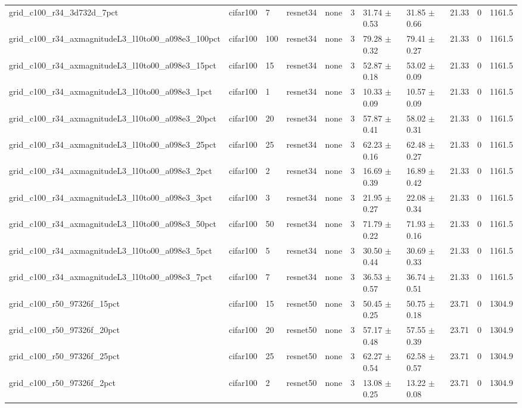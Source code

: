 \begin{tabular}{lllllllllll}
grid_c100_r34_3d732d_7pct & cifar100 & 7 & resnet34 & none & 3 & 31.74 $\pm$ 0.53 & 31.85 $\pm$ 0.66 & 21.33 & 0 & 1161.5 \\
grid_c100_r34_axmagnitudeL3_l10to00_a098e3_100pct & cifar100 & 100 & resnet34 & none & 3 & 79.28 $\pm$ 0.32 & 79.41 $\pm$ 0.27 & 21.33 & 0 & 1161.5 \\
grid_c100_r34_axmagnitudeL3_l10to00_a098e3_15pct & cifar100 & 15 & resnet34 & none & 3 & 52.87 $\pm$ 0.18 & 53.02 $\pm$ 0.09 & 21.33 & 0 & 1161.5 \\
grid_c100_r34_axmagnitudeL3_l10to00_a098e3_1pct & cifar100 & 1 & resnet34 & none & 3 & 10.33 $\pm$ 0.09 & 10.57 $\pm$ 0.09 & 21.33 & 0 & 1161.5 \\
grid_c100_r34_axmagnitudeL3_l10to00_a098e3_20pct & cifar100 & 20 & resnet34 & none & 3 & 57.87 $\pm$ 0.41 & 58.02 $\pm$ 0.31 & 21.33 & 0 & 1161.5 \\
grid_c100_r34_axmagnitudeL3_l10to00_a098e3_25pct & cifar100 & 25 & resnet34 & none & 3 & 62.23 $\pm$ 0.16 & 62.48 $\pm$ 0.27 & 21.33 & 0 & 1161.5 \\
grid_c100_r34_axmagnitudeL3_l10to00_a098e3_2pct & cifar100 & 2 & resnet34 & none & 3 & 16.69 $\pm$ 0.39 & 16.89 $\pm$ 0.42 & 21.33 & 0 & 1161.5 \\
grid_c100_r34_axmagnitudeL3_l10to00_a098e3_3pct & cifar100 & 3 & resnet34 & none & 3 & 21.95 $\pm$ 0.27 & 22.08 $\pm$ 0.34 & 21.33 & 0 & 1161.5 \\
grid_c100_r34_axmagnitudeL3_l10to00_a098e3_50pct & cifar100 & 50 & resnet34 & none & 3 & 71.79 $\pm$ 0.22 & 71.93 $\pm$ 0.16 & 21.33 & 0 & 1161.5 \\
grid_c100_r34_axmagnitudeL3_l10to00_a098e3_5pct & cifar100 & 5 & resnet34 & none & 3 & 30.50 $\pm$ 0.44 & 30.69 $\pm$ 0.33 & 21.33 & 0 & 1161.5 \\
grid_c100_r34_axmagnitudeL3_l10to00_a098e3_7pct & cifar100 & 7 & resnet34 & none & 3 & 36.53 $\pm$ 0.57 & 36.74 $\pm$ 0.51 & 21.33 & 0 & 1161.5 \\
grid_c100_r50_97326f_15pct & cifar100 & 15 & resnet50 & none & 3 & 50.45 $\pm$ 0.25 & 50.75 $\pm$ 0.18 & 23.71 & 0 & 1304.9 \\
grid_c100_r50_97326f_20pct & cifar100 & 20 & resnet50 & none & 3 & 57.17 $\pm$ 0.48 & 57.55 $\pm$ 0.39 & 23.71 & 0 & 1304.9 \\
grid_c100_r50_97326f_25pct & cifar100 & 25 & resnet50 & none & 3 & 62.27 $\pm$ 0.54 & 62.58 $\pm$ 0.57 & 23.71 & 0 & 1304.9 \\
grid_c100_r50_97326f_2pct & cifar100 & 2 & resnet50 & none & 3 & 13.08 $\pm$ 0.25 & 13.22 $\pm$ 0.08 & 23.71 & 0 & 1304.9 \\

\end{tabular}
